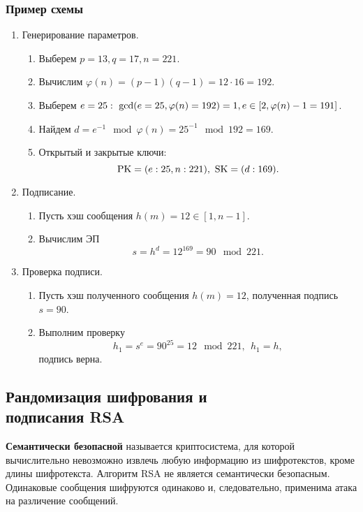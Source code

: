 \subsubsection{Пример схемы}

\begin{enumerate}
    \item Генерирование параметров.
        \begin{enumerate}
            \item Выберем $p=13, q=17, n = 221$.
            \item Вычислим $\varphi(n) = (p-1)(q-1) = 12 \cdot 16 = 192$.
            \item Выберем $e=25: ~ \gcd(e = 25, \varphi(n) = 192) = 1, \\
                e \in [2, \varphi(n) - 1 = 191]$.
            \item Найдем $d = e^{-1} \mod \varphi(n) = 25^{-1} \mod 192 = 169$.
            \item Открытый и закрытые ключи:
                \[ \textrm{PK} = (e:25, n:221), ~ \textrm{SK} = (d:169). \]
        \end{enumerate}
    \item Подписание.
        \begin{enumerate}
            \item Пусть хэш сообщения $h(m) = 12 \in [1, n-1]$.
            \item Вычислим ЭП
                \[ s = h^d = 12^{169} = 90 \mod 221. \]
        \end{enumerate}
    \item Проверка подписи.
        \begin{enumerate}
            \item Пусть хэш полученного сообщения $h(m) = 12$, полученная подпись $s = 90$.
            \item Выполним проверку
                \[ h_1 = s^e = 90^{25} = 12 \mod 221, ~~ h_1 = h, \]
                подпись верна.
        \end{enumerate}
\end{enumerate}


\subsection[Рандомизация шифрования и ЭП]{Рандомизация шифрования и \protect\\ подписания RSA}

\textbf{Семантически безопасной} называется криптосистема, для которой вычислительно невозможно извлечь любую информацию из шифротекстов, кроме длины шифротекста. Алгоритм RSA не является семантически безопасным. Одинаковые сообщения шифруются одинаково и, следовательно, применима атака на различение сообщений.

